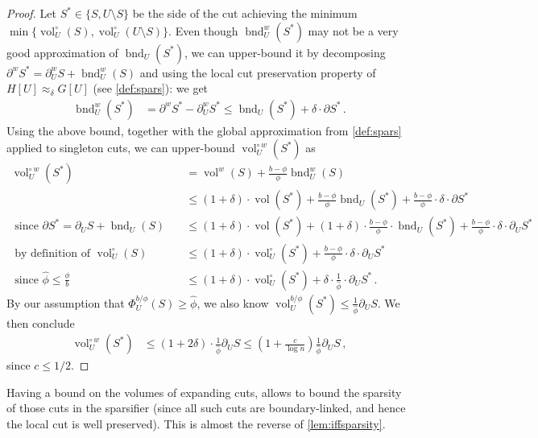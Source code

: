 \documentclass[epsfig,letter,11pt]{article}
\numberwithin{equation}{section}
\DeclareMathOperator{\vol}{vol}
\newcommand{\unbor}[2]{\operatorname{bnd}_{#2} (#1)}
\newcommand{\wbor}[2]{\operatorname{bnd}_{#2}^w (#1)}
\newcommand{\unvolc}[2]{\operatorname{vol}_{#2}^\circ (#1)}
\newcommand{\wvolc}[2]{\operatorname{vol}_{#2}^{\circ \,w} (#1)}
\newcommand{\wvol}[1]{\operatorname{vol}^{w} (#1)}
\newcommand{\uncut}[2]{{\partial}_{#2} #1}
\newcommand{\uncutg}[1]{{\partial} #1}
\newcommand{\wcut}[2]{\partial^w_{#2} #1}
\newcommand{\wcutg}[1]{\partial^w #1}
\renewcommand{\hat}{\widehat}
\begin{document}
\begin{proof}
	Let $S^* \in \{S, U \setminus S\}$ be the side of the cut achieving the minimum $\min\{\unvolc{S}{U}, \unvolc{U \setminus S}{U}\}$. Even though $\wbor{S^*}{U}$ may not be a very good approximation of $\unbor{S^*}{U}$, we can upper-bound it by decomposing  $\wcutg{S^*}=\wcut{S}{U}+\wbor{S}{U}$ and using the local cut preservation property of $H[U] \approx_\delta G[U]$ (see \cref{def:spars}): we get
	\begin{align*}
		\wbor{S^*}{U} & = \wcutg{S^*} - \wcut{S^*}{U} \le  \unbor{S^*}{U}+\delta \cdot \uncutg{S^*} \, .
	\end{align*}
Using the above bound, together with the global approximation from \cref{def:spars} applied to singleton cuts, we can upper-bound $\wvolc{S^*}{U}$ as
	\begin{align*}
		\wvolc{S^*}{U} & = \wvol{S}+\frac{b-\phi}{\phi}\wbor{S}{U} \\
		& \le  (1+\delta) \cdot \vol(S^*)+\frac{b-\phi}{\phi} \unbor{S^*}{U} + \frac{b-\phi}{\phi}  \cdot \delta \cdot \uncutg{S^*}\\
		\text{ since $\uncutg{S^*}=\uncut{S}{U}+\unbor{S}{U}$} \quad & \le (1+\delta) \cdot \vol(S^*)+ (1+\delta) \cdot\frac{b-\phi}{\phi}  \cdot \unbor{S^*}{U}+ \frac{b-\phi}{\phi}  \cdot \delta \cdot \uncut{S^*}{U}\\
		\text{ by definition of $\unvolc{S}{U}$} \quad & \le (1+\delta) \cdot \vol_U^{\circ}(S^*)+ \frac{b-\phi}{\phi}  \cdot \delta \cdot \uncut{S^*}{U}\\
		\text{ since $\hat{\phi} \le \frac{\phi}{b}$} \quad & \le (1+\delta) \cdot  \unvolc{S^*}{U} + \delta \cdot  \frac{1}{\hat{\phi}} \cdot \uncut{S^*}{U} \, .
	\end{align*}
By our assumption that $\Phi_U^{b/\phi}(S) \ge \hat{\phi}$, we also know $\vol_U^{b/\phi}(S^*) \le \frac{1}{\hat{\phi}} \uncut{S}{U}$. We then conclude
\begin{align*}
	\wvolc{S^*}{U}
	& \le (1+2\delta) \cdot \frac{1}{\hat{\phi}} \uncut{S}{U} \le \left(1+\frac{c}{\log n}\right) \frac{1}{\hat{\phi}} \uncut{S}{U}\, ,
\end{align*}
since $c \le 1/2$.
\end{proof}
\noindent
Having a bound on the volumes of expanding cuts, allows to bound the sparsity of those cuts in the sparsifier (since all such cuts are boundary-linked, and hence the local cut is well preserved). This is almost the reverse of \cref{lem:iffsparsity}.
\end{document}
